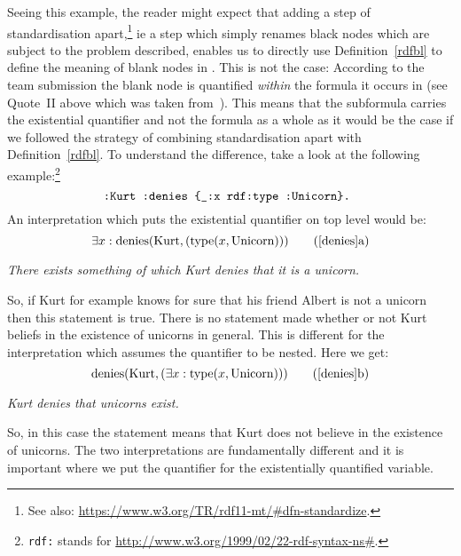 Seeing this example, the reader might expect that adding a step of standardisation apart,\footnote{See also: \url{https://www.w3.org/TR/rdf11-mt/\#dfn-standardize}.} 
ie  a step which simply renames black nodes which are subject to the problem described, enables us to directly use Definition~\ref{rdfbl} to define the meaning of blank nodes 
in \nthree. This is not the case: According to the \wwwc team submission the blank node is quantified \emph{within} the formula it occurs in 
(see Quote~II above which was taken from~\cite{Notation3}). This means that the subformula carries the existential quantifier and not the formula as a whole as it would be the case if we followed
the strategy of combining standardisation apart with Definition~\ref{rdfbl}. 
To understand the difference, take a look at the following example:\footnote{\texttt{rdf:} stands for  \url{http://www.w3.org/1999/02/22-rdf-syntax-ns\#}. }
% 
% 
% 
% 
\begin{equation}\label{denies}
\verb!:Kurt :denies {_:x rdf:type :Unicorn}. !
\end{equation}
An interpretation which puts the existential quantifier on top level would be:
\[
\exists x : \text{denies}(\text{Kurt}, (\text{type}(x, \text{Unicorn})))\tag{\ref{denies}a} \label{dtop}
\]
\begin{center}\textit{
There exists something of which Kurt denies that it is a unicorn.
}
\end{center}
So, if Kurt for example knows for sure that his friend Albert is not a unicorn then this statement is true. There is no statement made whether or not Kurt beliefs 
in the existence of unicorns in general. This is different for the interpretation which assumes the quantifier to be nested. Here we get:
\[
 \text{denies}(\text{Kurt}, (\exists x : \text{type}(x, \text{Unicorn})))\tag{\ref{denies}b} \label{dnest}
\]
\begin{center}\textit{
Kurt denies that unicorns exist.
}
\end{center}
So, in this case the statement means that Kurt does not believe in the existence of unicorns. The two interpretations are fundamentally different and it is important where we put 
the quantifier for the existentially quantified variable.

